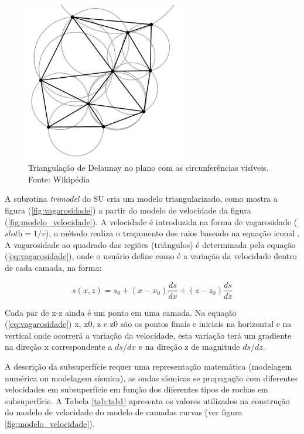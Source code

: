 \begin{figure}[H]
\centering
\includegraphics[width=7cm]{figuras/cap2/Delaunay_circumcircles_vectorial.pdf}
\caption{Triangulação de Delaunay no plano com as circunferências visíveis. Fonte: Wikipédia}
\label{fig:Delaunay_circumcircles_vectorial}
\end{figure}

A subrotina \textit{trimodel} do SU cria um modelo triangularizado, como mostra a figura (\ref{fig:vagarosidade}) a partir do modelo de velocidade da figura (\ref{fig:modelo_velocidade}). 
A velocidade é introduzida na forma de vagarosidade ($\textit{sloth}=1/v$), o método realiza o traçamento dos raios baseado na equação iconal \cite{Forel(2005)}. A vagarosidade ao quadrado das regiões (triângulos) é determinada pela equação (\ref{eq:vagarosidade}), onde o usuário define como é a variação da velocidade dentro de cada camada, na forma:

\begin{equation}
s(x,z)=s_{0}+\left(x-x_{0}\right) \frac{ds}{dx}+\left(z-z_{0}\right) \frac{ds}{dz}
\label{eq:vagarosidade}
\end{equation}

Cada par de x-z ainda é um ponto em uma camada. Na equação (\ref{eq:vagarosidade}) x, x0, z e z0 são os pontos finais e iniciais na horizontal e na vertical onde ocorrerá a variação da velocidade, esta variação terá um gradiente na direção x correspondente a $ds/dx$ e na direção z de magnitude $ds/dz$.

A descrição da subsuperfície requer uma representação matemática (modelagem numérica ou modelagem sísmica), as ondas sísmicas se propagação com diferentes velocidades em subsuperfície em função dos diferentes tipos de rochas em subsuperfície. A Tabela \ref{tab:tab1} apresenta os valores utilizados na construção do modelo de velocidade do modelo de camadas curvas (ver figura \ref{fig:modelo_velocidade}).

